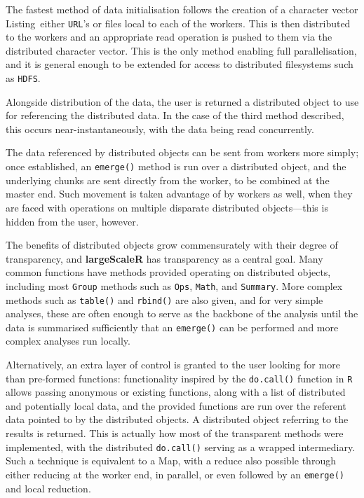 The fastest method of data initialisation follows the creation of a character vector Listing~either \texttt{URL}'s or files local to each of the workers.
This is then distributed to the workers and an appropriate read operation is pushed to them via the distributed character vector.
This is the only method enabling full parallelisation, and it is general enough to be extended for access to distributed filesystems such as \texttt{HDFS}.

Alongside distribution of the data, the user is returned a distributed object to use for referencing the distributed data.
In the case of the third method described, this occurs near-instantaneously, with the data being read concurrently.

The data referenced by distributed objects can be sent from workers more simply; once established, an \texttt{emerge()} method is run over a distributed object, and the underlying chunks are sent directly from the worker, to be combined at the master end.
Such movement is taken advantage of by workers as well, when they are faced with operations on multiple disparate distributed objects---this is hidden from the user, however.

The benefits of distributed objects grow commensurately with their degree of transparency, and \textbf{largeScaleR} has transparency as a central goal.
Many common functions have methods provided operating on distributed objects, including most \texttt{Group} methods such as \texttt{Ops}, \texttt{Math}, and \texttt{Summary}.
More complex methods such as \texttt{table()} and \texttt{rbind()} are also given, and for very simple analyses, these are often enough to serve as the backbone of the analysis until the data is summarised sufficiently that an \texttt{emerge()} can be performed and more complex analyses run locally.

Alternatively, an extra layer of control is granted to the user looking for more than pre-formed functions:
functionality inspired by the \texttt{do.call()} function in \texttt{R} allows passing anonymous or existing functions, along with a list of distributed and potentially local data, and the provided functions are run over the referent data pointed to by the distributed objects.
A distributed object referring to the results is returned.
This is actually how most of the transparent methods were implemented, with the distributed \texttt{do.call()} serving as a wrapped intermediary.
Such a technique is equivalent to a Map, with a reduce also possible through either reducing at the worker end, in parallel, or even followed by an \texttt{emerge()} and local reduction\cite{mccool2012structured}.


